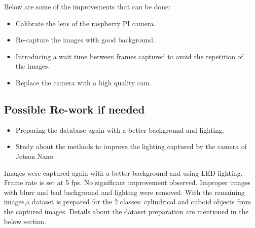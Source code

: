 Below are some of the improvements that can be done: 
\begin{itemize}
	\item Calibrate the lens of the raspberry PI camera. 
	\item Re-capture the images with good background. 
	\item Introducing a wait time between frames captured to avoid the repetition of the images. 
	\item Replace the camera with a high quality cam.  
\end{itemize}

\subsection{Possible Re-work if needed }

\begin{itemize}
	\item Preparing the database again with a better background and lighting. 
	\item Study about the methods to improve the lighting captured by the camera of Jetson Nano 
\end{itemize}
Images were captured again with a better background and using LED lighting. Frame rate is set at 5 \ac{fps}. No significant improvement observed. Improper images with blurr and bad background and lighting were removed. With the remaining images,a dataset is prepared for the 2 classes: cylindrical and cuboid objects from the captured images. Details about the dataset preparation are mentioned in the below section.

